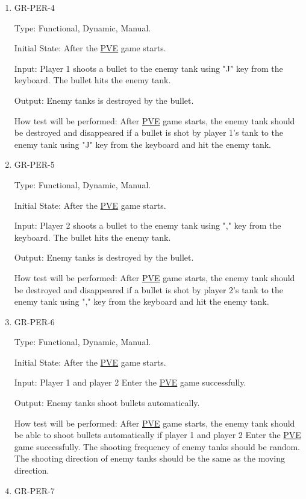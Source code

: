 \documentclass[12pt, titlepage]{article}
\begin{document}
\begin{enumerate}
\item{GR-PER-4\\}

Type: Functional, Dynamic, Manual.
					
Initial State: After the \underline{PVE} game starts.
					
Input: Player 1 shoots a bullet to the enemy tank using "J" key from the keyboard. The bullet hits the enemy tank.
					
Output: Enemy tanks is destroyed by the bullet.
					
How test will be performed: After \underline{PVE} game starts, the enemy tank should be destroyed and disappeared if a bullet is shot by player 1's tank to the enemy tank using "J" key from the keyboard and hit the enemy tank. 

\item{GR-PER-5\\}

Type: Functional, Dynamic, Manual.
					
Initial State: After the \underline{PVE} game starts.
					
Input: Player 2 shoots a bullet to the enemy tank using "," key from the keyboard. The bullet hits the enemy tank.
					
Output: Enemy tanks is destroyed by the bullet.
					
How test will be performed: After \underline{PVE} game starts, the enemy tank should be destroyed and disappeared if a bullet is shot by player 2's tank to the enemy tank using "," key from the keyboard and hit the enemy tank. 

\item{GR-PER-6\\}

Type: Functional, Dynamic, Manual.
					
Initial State: After the \underline{PVE} game starts.
					
Input: Player 1 and player 2 Enter the \underline{PVE} game successfully.
					
Output: Enemy tanks shoot bullets automatically. 
					
How test will be performed: After \underline{PVE} game starts, the enemy tank should be able to shoot bullets automatically if player 1 and player 2 Enter the \underline{PVE} game successfully. The shooting frequency of enemy tanks should be random. The shooting direction of enemy tanks should be the same as the moving direction.

\item{GR-PER-7\\}


\end{enumerate}
\end{document}
